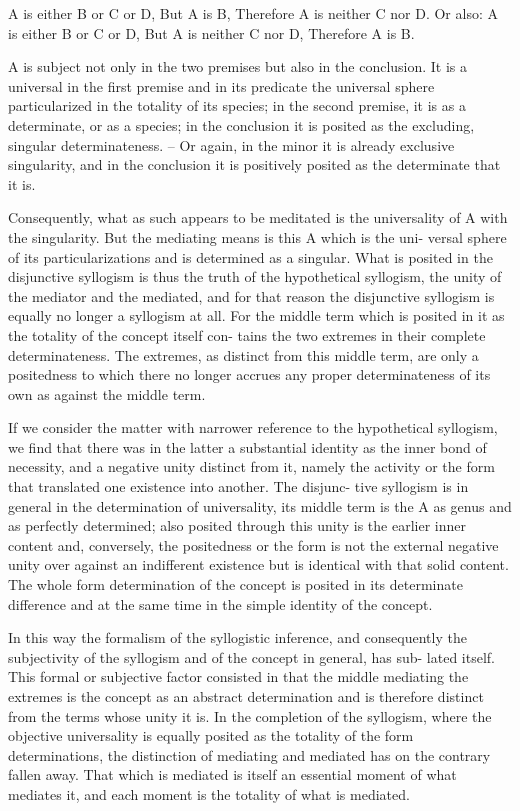 A is either B or C or D,
But A is B,
Therefore A is neither C nor D.
Or also:
A is either B or C or D,
But A is neither C nor D,
Therefore A is B.

A is subject not only in the two premises but also in the conclusion. It
is a universal in the first premise and in its predicate the universal sphere
particularized in the totality of its species; in the second premise, it is as a
determinate, or as a species; in the conclusion it is posited as the excluding,
singular determinateness. – Or again, in the minor it is already exclusive
singularity, and in the conclusion it is positively posited as the determinate
that it is.

Consequently, what as such appears to be meditated is the universality of
A with the singularity. But the mediating means is this A which is the uni-
versal sphere of its particularizations and is determined as a singular. What
is posited in the disjunctive syllogism is thus the truth of the hypothetical
syllogism, the unity of the mediator and the mediated, and for that reason
the disjunctive syllogism is equally no longer a syllogism at all. For the
middle term which is posited in it as the totality of the concept itself con-
tains the two extremes in their complete determinateness. The extremes,
as distinct from this middle term, are only a positedness to which there no
longer accrues any proper determinateness of its own as against the middle
term.

If we consider the matter with narrower reference to the hypothetical
syllogism, we find that there was in the latter a substantial identity as the
inner bond of necessity, and a negative unity distinct from it, namely the
activity or the form that translated one existence into another. The disjunc-
tive syllogism is in general in the determination of universality, its middle
term is the A as genus and as perfectly determined; also posited through this
unity is the earlier inner content and, conversely, the positedness or the
form is not the external negative unity over against an indifferent existence
but is identical with that solid content. The whole form determination of
the concept is posited in its determinate difference and at the same time in
the simple identity of the concept.

In this way the formalism of the syllogistic inference, and consequently
the subjectivity of the syllogism and of the concept in general, has sub-
lated itself. This formal or subjective factor consisted in that the middle
mediating the extremes is the concept as an abstract determination and is
therefore distinct from the terms whose unity it is. In the completion of the
syllogism, where the objective universality is equally posited as the totality
of the form determinations, the distinction of mediating and mediated has
on the contrary fallen away. That which is mediated is itself an essential
moment of what mediates it, and each moment is the totality of what is
mediated.

